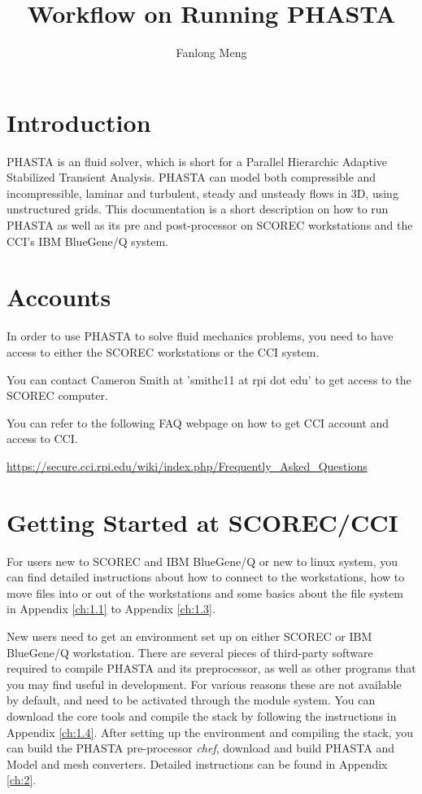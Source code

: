 \documentclass{article}
\title{Workflow on Running PHASTA}
\author{Fanlong Meng}
\begin{document}
\lstset{style=myc}

\maketitle

\section{Introduction}

PHASTA is an fluid solver, which is short for a Parallel Hierarchic Adaptive Stabilized Transient Analysis. PHASTA can model both compressible and incompressible, laminar and turbulent, steady and unsteady flows in 3D, using unstructured grids. This documentation is a short description on how to run PHASTA as well as its pre and post-processor on SCOREC workstations and the CCI's IBM BlueGene/Q system. 

\section{Accounts}

In order to use PHASTA to solve fluid mechanics problems, you need to have access to either the SCOREC workstations or the CCI system.

You can contact Cameron Smith at 'smithc11 at rpi dot edu' to get access to the SCOREC computer. 

You can refer to the following FAQ webpage on how to get CCI account and access to CCI.


\url{https://secure.cci.rpi.edu/wiki/index.php/Frequently_Asked_Questions}

\section{Getting Started at SCOREC/CCI}

For users new to SCOREC and IBM BlueGene/Q or new to linux system, you can find detailed instructions about how to connect to the workstations, how to move files into or out of the workstations and some basics about the file system in Appendix \ref{ch:1.1} to Appendix \ref{ch:1.3}.

New users need to get an environment set up on either SCOREC or IBM BlueGene/Q workstation. There are several pieces of third-party software required to compile PHASTA and its preprocessor, as well as other programs that you may find useful in development. For various reasons these are not available by default, and need to be activated through the module system. You can download the core tools and compile the stack by following the instructions in Appendix \ref{ch:1.4}. After setting up the environment and compiling the stack, you can build the PHASTA pre-processor \textit{chef}, download and build PHASTA and Model and mesh converters. Detailed instructions can be found in Appendix \ref{ch:2}.
\end{document}
